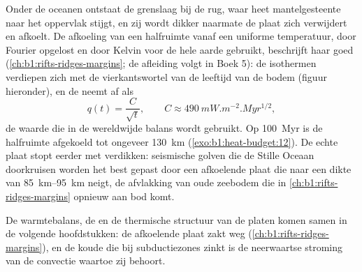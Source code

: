 Onder de oceanen ontstaat de grenslaag bij de rug, waar heet mantelgesteente naar het oppervlak stijgt, en zij wordt dikker naarmate de plaat zich verwijdert en afkoelt. De afkoeling van een halfruimte vanaf een uniforme temperatuur, door Fourier opgelost en door Kelvin voor de hele aarde gebruikt, beschrijft haar goed (\cref{ch:b1:rifts-ridges-margins}; de afleiding volgt in Boek 5): de isothermen verdiepen zich met de vierkantswortel van de leeftijd van de bodem (figuur hieronder), en de  neemt af als
\[
  q(t) = \frac{C}{\sqrt t}, \qquad C \approx \qty{490}{mW.m^{-2}.Myr^{1/2}},
\]
de waarde die in de wereldwijde balans wordt gebruikt. %
Op \qty{100}{Myr} is de halfruimte afgekoeld tot ongeveer \qty{130}{km} (\cref{exo:b1:heat-budget:12}). De echte plaat stopt eerder met verdikken: seismische golven die de Stille Oceaan doorkruisen worden het best gepast door een afkoelende plaat die naar een dikte van \qtyrange{85}{95}{km} neigt, de afvlakking van oude zeebodem die in \cref{ch:b1:rifts-ridges-margins} opnieuw aan bod komt.

De warmtebalans, de  en de thermische structuur van de platen komen samen in de volgende hoofdstukken: de afkoelende plaat zakt weg (\cref{ch:b1:rifts-ridges-margins}), en de koude  die bij subductiezones zinkt is de neerwaartse stroming van de convectie waartoe zij behoort.

